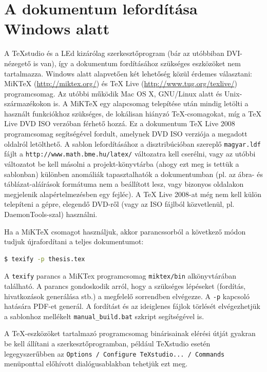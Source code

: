 \section{A dokumentum lefordítása Windows alatt}
A TeXstudio és a LEd kizárólag szerkesztőprogram (bár az utóbbiban DVI-nézegető
is van), így a dokumentum fordításához szükséges eszközöket nem tartalmazza.
Windows alatt alapvetően két lehetőség közül érdemes választani: MiKTeX
(\url{http://miktex.org/}) és TeX Live (\url{http://www.tug.org/texlive/})
programcsomag. Az utóbbi működik Mac OS X, GNU/Linux alatt és Unix-származékokon
is. A MiKTeX egy alapcsomag telepítése után mindig letölti a használt
funkciókhoz szükséges, de lokálisan hiányzó \TeX-csomagokat, míg a TeX Live DVD
ISO verzóban férhető hozzá. Ez a dokumentum TeX Live 2008 programcsomag
segítségével fordult, amelynek DVD ISO verziója a megadott oldalról letölthető.
A sablon lefordításához a disztribúcióban szereplő \verb+magyar.ldf+ fájlt a
\verb+http://www.math.bme.hu/latex/+ változatra kell cserélni, vagy az utóbbi
változatot be kell másolni a projekt-könyvtárba (ahogy ezt meg is tettük a
sablonban) különben anomáliák tapasztalhatók a dokumentumban (pl. az ábra- és
táblázat-aláírások formátuma nem a beállított lesz, vagy bizonyos oldalakon
megjelenik alapértelmezésben egy fejléc). A TeX Live 2008-at még nem kell külön
telepíteni a gépre, elegendő DVD-ről (vagy az ISO fájlból közvetlenül, pl.
DaemonTools-szal) használni.

Ha a MiKTeX csomagot használjuk, akkor parancssorból a következő módon tudjuk
újrafordítani a teljes dokumentumot:

\begin{lstlisting}[language=bash,frame=single,float=!ht]
$ texify -p thesis.tex
\end{lstlisting}

A \verb+texify+ parancs a MiKTex programcsomag \verb+miktex/bin+ alkönyvtárában
található. A parancs gondoskodik arról, hogy a szükséges lépéseket (fordítás,
hivatkozások generálása stb.) a megfelelő sorrendben elvégezze. A \verb+-p+
kapcsoló hatására PDF-et generál. A fordítást és az ideiglenes fájlok törlését
elvégezhetjük a sablonhoz mellékelt \verb+manual_build.bat+ szkript segítségével
is.

A \TeX-eszközöket tartalmazó programcsomag binárisainak elérési útját gyakran be
kell állítani a szerkesztőprogramban, például TeXstudio esetén legegyszerűbben
az \verb+Options / Configure TeXstudio... / Commands+ menüponttal előhívott
dialógusablakban tehetjük ezt meg.

